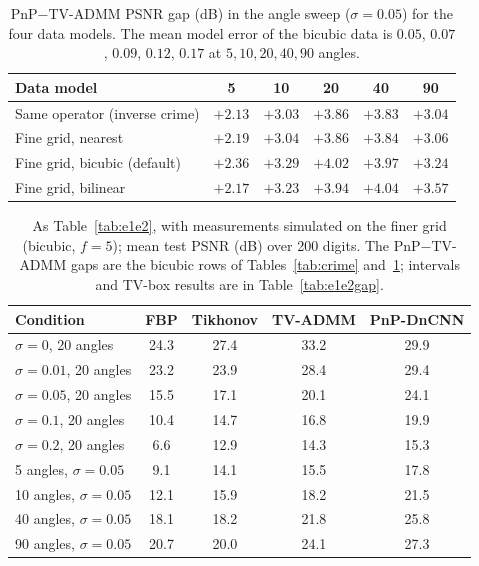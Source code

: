 \begin{table}[htbp]
\centering\small\setlength{\tabcolsep}{5pt}
\caption{PnP$-$TV-ADMM PSNR gap (dB) in the angle sweep ($\sigma=0.05$) for the four data models. The mean model error of the bicubic data is $0.05$, $0.07$, $0.09$, $0.12$, $0.17$ at $5,10,20,40,90$ angles.}\label{tab:crimeang}
\begin{tabular}{lccccc}
\toprule
Data model & 5 & 10 & 20 & 40 & 90 \\
\midrule
Same operator (inverse crime) & $+2.13$ & $+3.03$ & $+3.86$ & $+3.83$ & $+3.04$ \\
Fine grid, nearest            & $+2.19$ & $+3.04$ & $+3.86$ & $+3.84$ & $+3.06$ \\
Fine grid, bicubic (default)  & $+2.36$ & $+3.29$ & $+4.02$ & $+3.97$ & $+3.24$ \\
Fine grid, bilinear           & $+2.17$ & $+3.23$ & $+3.94$ & $+4.04$ & $+3.57$ \\
\bottomrule
\end{tabular}
\end{table}

\begin{table}[htbp]
\centering\small\setlength{\tabcolsep}{5pt}
\caption{As Table~\ref{tab:e1e2}, with measurements simulated on the finer grid (bicubic, $f=5$); mean test PSNR (dB) over 200 digits. The PnP$-$TV-ADMM gaps are the bicubic rows of Tables~\ref{tab:crime} and~\ref{tab:crimeang}; intervals and TV-box results are in Table~\ref{tab:e1e2gap}.}\label{tab:table1fine}
\begin{tabular}{lcccc}
\toprule
Condition & FBP & Tikhonov & TV-ADMM & PnP-DnCNN \\
\midrule
$\sigma=0$, 20 angles    & 24.3 & 27.4 & 33.2 & 29.9 \\
$\sigma=0.01$, 20 angles & 23.2 & 23.9 & 28.4 & 29.4 \\
$\sigma=0.05$, 20 angles & 15.5 & 17.1 & 20.1 & 24.1 \\
$\sigma=0.1$, 20 angles  & 10.4 & 14.7 & 16.8 & 19.9 \\
$\sigma=0.2$, 20 angles  &  6.6 & 12.9 & 14.3 & 15.3 \\
5 angles, $\sigma=0.05$  &  9.1 & 14.1 & 15.5 & 17.8 \\
10 angles, $\sigma=0.05$ & 12.1 & 15.9 & 18.2 & 21.5 \\
40 angles, $\sigma=0.05$ & 18.1 & 18.2 & 21.8 & 25.8 \\
90 angles, $\sigma=0.05$ & 20.7 & 20.0 & 24.1 & 27.3 \\
\bottomrule
\end{tabular}
\end{table}

